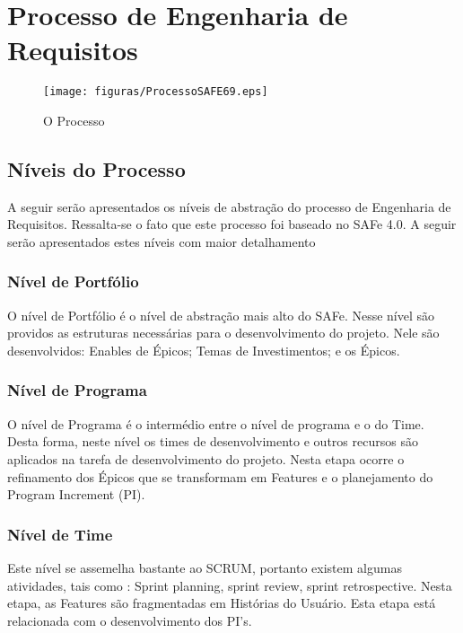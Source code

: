 \chapter[Processo de Engenharia de Requisitos]{Processo de Engenharia de Requisitos}


\begin{figure}[h]
    \centering
    \label{fig01}
        \texttt{[image: figuras/ProcessoSAFE69.eps]}
    \caption{O Processo}
\end{figure}


{
    \large{\section {Níveis do Processo\\} }

    \tab A seguir serão apresentados os níveis de abstração do processo de Engenharia de Requisitos. Ressalta-se o fato que este processo foi baseado no SAFe 4.0. A seguir serão apresentados estes níveis com maior detalhamento\\

}

{
    \large{\subsection {Nível de Portfólio\\} }

    \tab O nível de Portfólio é o nível de abstração mais alto do SAFe. Nesse nível são providos as estruturas necessárias para o desenvolvimento do projeto.  Nele são desenvolvidos: Enables de Épicos; Temas de Investimentos; e os Épicos. \\

}


{
     \large{\subsection {Nível de Programa\\} }

     \tab O nível de Programa é o intermédio entre o nível de programa e o do Time. Desta forma, neste nível os times de desenvolvimento e outros recursos são aplicados na tarefa de desenvolvimento do projeto.  Nesta etapa ocorre o refinamento dos Épicos que se transformam em Features e o planejamento do Program Increment (PI).\\
}

{
    \large{\subsection {Nível de Time\\} }

    \tab Este nível se assemelha bastante ao SCRUM,  portanto existem algumas atividades, tais como : Sprint planning, sprint review, sprint retrospective. Nesta etapa, as Features são fragmentadas em Histórias do Usuário. Esta etapa está relacionada com o desenvolvimento dos PI’s. \\
}

